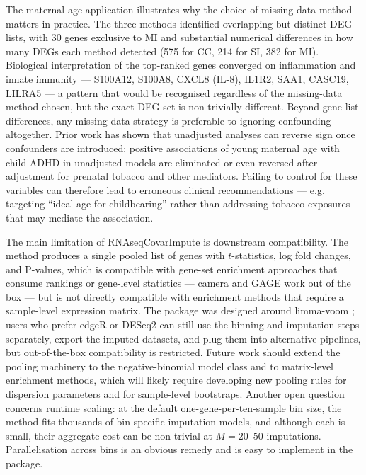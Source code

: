 \documentclass[11pt]{article}
\begin{document}
The maternal-age application illustrates why the choice of missing-data method matters in practice. The three methods identified overlapping but distinct DEG lists, with 30 genes exclusive to MI and substantial numerical differences in how many DEGs each method detected (575 for CC, 214 for SI, 382 for MI). Biological interpretation of the top-ranked genes converged on inflammation and innate immunity --- S100A12, S100A8, CXCL8 (IL-8), IL1R2, SAA1, CASC19, LILRA5 --- a pattern that would be recognised regardless of the missing-data method chosen, but the exact DEG set is non-trivially different. Beyond gene-list differences, any missing-data strategy is preferable to ignoring confounding altogether. Prior work has shown that unadjusted analyses can reverse sign once confounders are introduced: positive associations of young maternal age with child ADHD in unadjusted models are eliminated or even reversed after adjustment for prenatal tobacco and other mediators. Failing to control for these variables can therefore lead to erroneous clinical recommendations --- e.g. targeting ``ideal age for childbearing'' rather than addressing tobacco exposures that may mediate the association.

The main limitation of RNAseqCovarImpute is downstream compatibility. The method produces a single pooled list of genes with $t$-statistics, log fold changes, and P-values, which is compatible with gene-set enrichment approaches that consume rankings or gene-level statistics --- camera \citep{wu2012camera} and GAGE \citep{luo2009gage} work out of the box --- but is not directly compatible with enrichment methods that require a sample-level expression matrix. The package was designed around limma-voom \citep{law2014voom,ritchie2015limma}; users who prefer edgeR \citep{robinson2010edger} or DESeq2 \citep{love2014deseq2} can still use the binning and imputation steps separately, export the imputed datasets, and plug them into alternative pipelines, but out-of-the-box compatibility is restricted. Future work should extend the pooling machinery to the negative-binomial model class and to matrix-level enrichment methods, which will likely require developing new pooling rules for dispersion parameters and for sample-level bootstraps. Another open question concerns runtime scaling: at the default one-gene-per-ten-sample bin size, the method fits thousands of bin-specific imputation models, and although each is small, their aggregate cost can be non-trivial at $M=20$--$50$ imputations. Parallelisation across bins is an obvious remedy and is easy to implement in the package.
\end{document}
